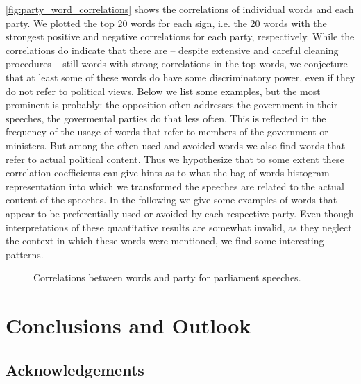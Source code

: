 \documentclass[runningheads,a4paper]{llncs}
\begin{document}
\autoref{fig:party_word_correlations} shows the correlations of individual words and each party. We plotted the top 20 words for each sign, i.e. the 20 words with the strongest positive and negative correlations for each party, respectively. While the correlations do indicate that there are -- despite extensive and careful cleaning procedures -- still words with strong correlations in the top words, we conjecture that at least some of these words do have some discriminatory power, even if they do not refer to political views. Below we list some examples, but the most prominent is probably: the opposition often addresses the government in their speeches, the govermental parties do that less often. This is reflected in the frequency of the usage of words that refer to members of the government or ministers. But among the often used and avoided words we also find words that refer to actual political content. Thus we hypothesize that to some extent these correlation coefficients can give hints as to what the bag-of-words histogram representation into which we transformed the speeches are related to the actual content of the speeches. In the following we give some examples of words that appear to be preferentially used or avoided by each respective party. Even though interpretations of these quantitative results are somewhat invalid, as they neglect the context in which these words were mentioned, we find some interesting patterns. 

\begin{figure}
\begin{center}
%
\end{center}
\caption{
\label{fig:party_word_correlations}
Correlations between words and party for parliament speeches. }
\end{figure}


\section{Conclusions and Outlook}\label{sec:conclusion}



\small
\subsection*{Acknowledgements}

%
\small{

 
}
\end{document}
